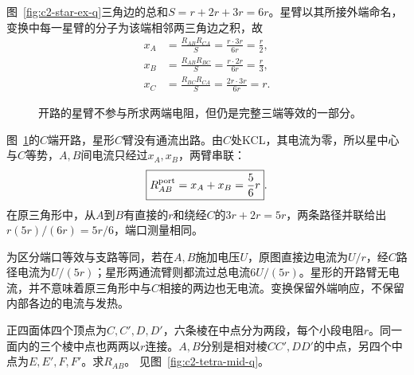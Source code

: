 \begin{solution}
图~\ref{fig:c2-star-ex-q}三角边的总和$S=r+2r+3r=6r$。星臂以其所接外端命名，变换中每一星臂的分子为该端相邻两三角边之积，故
\[
 \begin{aligned}
 x_A&=\frac{R_{AB}R_{CA}}S=\frac{r\cdot3r}{6r}=\frac r2,\\
 x_B&=\frac{R_{AB}R_{BC}}S=\frac{r\cdot2r}{6r}=\frac r3,\\
 x_C&=\frac{R_{BC}R_{CA}}S=\frac{2r\cdot3r}{6r}=r.
 \end{aligned}
\]
\begin{figure}[H]\centering
{}
\caption{开路的星臂不参与所求两端电阻，但仍是完整三端等效的一部分。}\label{fig:c2-star-ex-s}
\end{figure}
图~\ref{fig:c2-star-ex-s}的$C$端开路，星形$C$臂没有通流出路。由$C$处KCL，其电流为零，所以星中心与$C$等势，$A,B$间电流只经过$x_A,x_B$，两臂串联：
\[
 \boxed{R_{AB}^{\rm port}=x_A+x_B=\frac56r}.
\]
在原三角形中，从$A$到$B$有直接的$r$和绕经$C$的$3r+2r=5r$，两条路径并联给出$r(5r)/(6r)=5r/6$，端口测量相同。

为区分端口等效与支路等同，若在$A,B$施加电压$U$，原图直接边电流为$U/r$，经$C$路径电流为$U/(5r)$；星形两通流臂则都流过总电流$6U/(5r)$。星形的开路臂无电流，并不意味着原三角形中与$C$相接的两边也无电流。变换保留外端响应，不保留内部各边的电流与发热。
\end{solution}

\begin{example}[正四面体棱中点组成的网络]\label{ex:c2-tetra-mid}
正四面体四个顶点为$C,C',D,D'$，六条棱在中点分为两段，每个小段电阻$r$。同一面内的三个棱中点也两两以$r$连接。$A,B$分别是相对棱$CC',DD'$的中点，另四个中点为$E,E',F,F'$。求$R_{AB}$。 见图~\ref{fig:c2-tetra-mid-q}。
\end{example}

